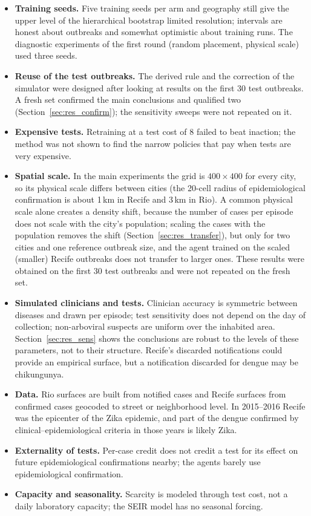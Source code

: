 \documentclass[11pt,a4paper]{article}
\begin{document}
\begin{itemize}
    \item \textbf{Training seeds.} Five training seeds per arm and geography still give the upper level of the hierarchical bootstrap limited resolution; intervals are honest about outbreaks and somewhat optimistic about training runs. The diagnostic experiments of the first round (random placement, physical scale) used three seeds.
    \item \textbf{Reuse of the test outbreaks.} The derived rule and the correction of the simulator were designed after looking at results on the first 30 test outbreaks. A fresh set confirmed the main conclusions and qualified two (Section~\ref{sec:res_confirm}); the sensitivity sweeps were not repeated on it.
    \item \textbf{Expensive tests.} Retraining at a test cost of 8 failed to beat inaction; the method was not shown to find the narrow policies that pay when tests are very expensive.
    \item \textbf{Spatial scale.} In the main experiments the grid is $400 \times 400$ for every city, so its physical scale differs between cities (the 20-cell radius of epidemiological confirmation is about 1\,km in Recife and 3\,km in Rio). A common physical scale alone creates a density shift, because the number of cases per episode does not scale with the city's population; scaling the cases with the population removes the shift (Section~\ref{sec:res_transfer}), but only for two cities and one reference outbreak size, and the agent trained on the scaled (smaller) Recife outbreaks does not transfer to larger ones. These results were obtained on the first 30 test outbreaks and were not repeated on the fresh set.
    \item \textbf{Simulated clinicians and tests.} Clinician accuracy is symmetric between diseases and drawn per episode; test sensitivity does not depend on the day of collection; non-arboviral suspects are uniform over the inhabited area. Section~\ref{sec:res_sens} shows the conclusions are robust to the levels of these parameters, not to their structure. Recife's discarded notifications could provide an empirical surface, but a notification discarded for dengue may be chikungunya.
    \item \textbf{Data.} Rio surfaces are built from notified cases and Recife surfaces from confirmed cases geocoded to street or neighborhood level. In 2015--2016 Recife was the epicenter of the Zika epidemic, and part of the dengue confirmed by clinical--epidemiological criteria in those years is likely Zika.
    \item \textbf{Externality of tests.} Per-case credit does not credit a test for its effect on future epidemiological confirmations nearby; the agents barely use epidemiological confirmation.
    \item \textbf{Capacity and seasonality.} Scarcity is modeled through test cost, not a daily laboratory capacity; the SEIR model has no seasonal forcing.
\end{itemize}
\end{document}
